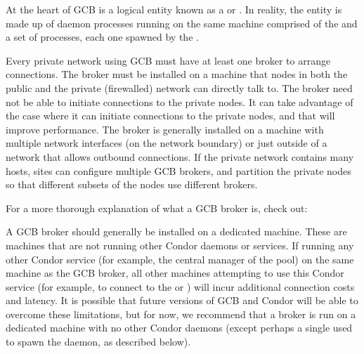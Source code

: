 At the heart of GCB is a logical entity known as a  or
.
In reality, the entity is made up of daemon
processes running on
the same machine comprised of the  and a set of
 processes, each one spawned by the
.

Every private network using GCB
must have at least one broker to arrange connections.
The broker must be installed on a machine that nodes in both the
public and the private (firewalled) network can directly talk to.
The broker need not be able to initiate connections to the
private nodes.  
It can take advantage of the case where it can
initiate connections to the private nodes, and that will improve
performance. 
The broker is generally installed on a 
machine with multiple network interfaces
(on the network boundary) or just outside
of a network that allows outbound connections.
If the private network contains many hosts, sites can configure
multiple GCB brokers, and partition the private nodes so that different
subsets of the nodes use different brokers.

For a more thorough explanation of what a GCB broker is, check out:

A GCB broker should generally be installed on a dedicated machine.
These are machines that are not running other Condor daemons or services.
If running any other Condor service 
(for example, the central manager of the pool)
on the same machine as the GCB broker,
all other machines attempting
to use this Condor service
(for example, to connect to the  or )
will incur additional connection costs and latency.
It is possible that future versions of GCB and Condor will be able to
overcome these limitations, but for now, we recommend that a broker
is run on a dedicated machine with no other Condor daemons (except
perhaps a single  used to spawn the 
daemon, as described below).


